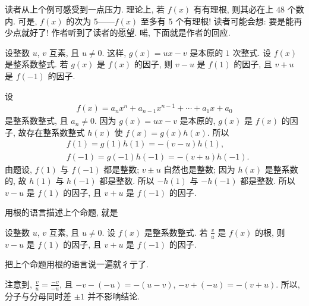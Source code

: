 读者从上个例可感受到一点压力. 理论上, 若 $f(x)$ 有有理根, 则其必在上 $48$ 个数内. 可是, $f(x)$ 的次为 $5$——$f(x)$ 至多有 $5$ 个有理根! 读者可能会想: 要是能再少点就好了! 作者听到了读者的愿望. 喏, 下面就是作者的回应.

\begin{proposition}
    设整数 $u$, $v$ 互素, 且 $u \neq 0$. 这样, $g(x) = ux - v$ 是本原的 $1$ 次整式. 设 $f(x)$ 是整系数整式. 若 $g(x)$ 是 $f(x)$ 的因子, 则 $v - u$ 是 $f(1)$ 的因子, 且 $v + u$ 是 $f(-1)$ 的因子.
\end{proposition}

\begin{pf}
    设
    \begin{align*}
        f(x) = a_n x^n + a_{n-1} x^{n-1} + \cdots + a_1 x + a_0
    \end{align*}
    是整系数整式, 且 $a_n \neq 0$. 因为 $g(x) = ux - v$ 是本原的, $g(x)$ 是 $f(x)$ 的因子, 故存在整系数整式 $h(x)$ 使 $f(x) = g(x)h(x)$. 所以
    \begin{align*}
         & f(1) = g(1) h(1) = -(v - u)h(1),     \\
         & f(-1) = g(-1) h(-1) = -(v + u)h(-1).
    \end{align*}
    由题设, $f(1)$ 与 $f(-1)$ 都是整数; $v \pm u$ 自然也是整数; 因为 $h(x)$ 是整系数的, 故 $h(1)$ 与 $h(-1)$ 都是整数. 所以 $-h(1)$ 与 $-h(-1)$ 都是整数. 所以 $v - u$ 是 $f(1)$ 的因子, 且 $v + u$ 是 $f(-1)$ 的因子.
\end{pf}

用根的语言描述上个命题, 就是
\begin{proposition}
    设整数 $u$, $v$ 互素, 且 $u \neq 0$. 设 $f(x)$ 是整系数整式. 若 $\frac{v}{u}$ 是 $f(x)$ 的根, 则 $v - u$ 是 $f(1)$ 的因子, 且 $v + u$ 是 $f(-1)$ 的因子.
\end{proposition}

\begin{pf}
    把上个命题用根的语言说一遍就彳亍了.
\end{pf}

\begin{remark}
    注意到, $\frac{v}{u} = \frac{-v}{-u}$, 且 $-v - (-u) = -(u - v)$, $-v + (-u) = -(v + u)$. 所以, 分子与分母同时差 $\pm 1$ 并不影响结论.
\end{remark}


